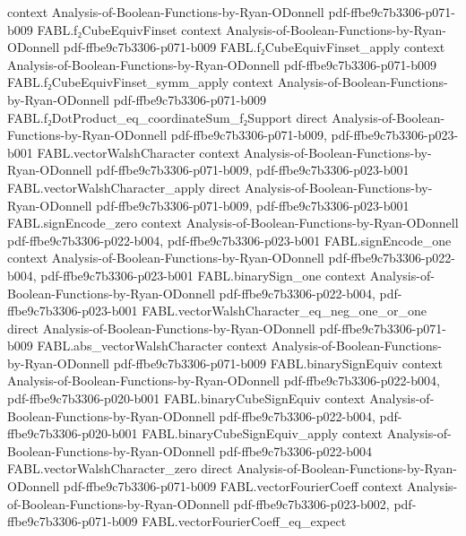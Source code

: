 \begin{theorem}
  {context}
  {Analysis-of-Boolean-Functions-by-Ryan-ODonnell}
  {pdf-ffbe9c7b3306-p071-b009}
\proofstep
  {FABL.f₂CubeEquivFinset}
  {context}
  {Analysis-of-Boolean-Functions-by-Ryan-ODonnell}
  {pdf-ffbe9c7b3306-p071-b009}
\proofstep
  {FABL.f₂CubeEquivFinset_apply}
  {context}
  {Analysis-of-Boolean-Functions-by-Ryan-ODonnell}
  {pdf-ffbe9c7b3306-p071-b009}
\proofstep
  {FABL.f₂CubeEquivFinset_symm_apply}
  {context}
  {Analysis-of-Boolean-Functions-by-Ryan-ODonnell}
  {pdf-ffbe9c7b3306-p071-b009}
\proofstep
  {FABL.f₂DotProduct_eq_coordinateSum_f₂Support}
  {direct}
  {Analysis-of-Boolean-Functions-by-Ryan-ODonnell}
  {pdf-ffbe9c7b3306-p071-b009,
    pdf-ffbe9c7b3306-p023-b001}
\proofstep
  {FABL.vectorWalshCharacter}
  {context}
  {Analysis-of-Boolean-Functions-by-Ryan-ODonnell}
  {pdf-ffbe9c7b3306-p071-b009,
    pdf-ffbe9c7b3306-p023-b001}
\proofstep
  {FABL.vectorWalshCharacter_apply}
  {direct}
  {Analysis-of-Boolean-Functions-by-Ryan-ODonnell}
  {pdf-ffbe9c7b3306-p071-b009,
    pdf-ffbe9c7b3306-p023-b001}
\proofstep
  {FABL.signEncode_zero}
  {context}
  {Analysis-of-Boolean-Functions-by-Ryan-ODonnell}
  {pdf-ffbe9c7b3306-p022-b004,
    pdf-ffbe9c7b3306-p023-b001}
\proofstep
  {FABL.signEncode_one}
  {context}
  {Analysis-of-Boolean-Functions-by-Ryan-ODonnell}
  {pdf-ffbe9c7b3306-p022-b004,
    pdf-ffbe9c7b3306-p023-b001}
\proofstep
  {FABL.binarySign_one}
  {context}
  {Analysis-of-Boolean-Functions-by-Ryan-ODonnell}
  {pdf-ffbe9c7b3306-p022-b004,
    pdf-ffbe9c7b3306-p023-b001}
\proofstep
  {FABL.vectorWalshCharacter_eq_neg_one_or_one}
  {direct}
  {Analysis-of-Boolean-Functions-by-Ryan-ODonnell}
  {pdf-ffbe9c7b3306-p071-b009}
\proofstep
  {FABL.abs_vectorWalshCharacter}
  {context}
  {Analysis-of-Boolean-Functions-by-Ryan-ODonnell}
  {pdf-ffbe9c7b3306-p071-b009}
\proofstep
  {FABL.binarySignEquiv}
  {context}
  {Analysis-of-Boolean-Functions-by-Ryan-ODonnell}
  {pdf-ffbe9c7b3306-p022-b004,
    pdf-ffbe9c7b3306-p020-b001}
\proofstep
  {FABL.binaryCubeSignEquiv}
  {context}
  {Analysis-of-Boolean-Functions-by-Ryan-ODonnell}
  {pdf-ffbe9c7b3306-p022-b004,
    pdf-ffbe9c7b3306-p020-b001}
\proofstep
  {FABL.binaryCubeSignEquiv_apply}
  {context}
  {Analysis-of-Boolean-Functions-by-Ryan-ODonnell}
  {pdf-ffbe9c7b3306-p022-b004}
\proofstep
  {FABL.vectorWalshCharacter_zero}
  {direct}
  {Analysis-of-Boolean-Functions-by-Ryan-ODonnell}
  {pdf-ffbe9c7b3306-p071-b009}
\proofstep
  {FABL.vectorFourierCoeff}
  {context}
  {Analysis-of-Boolean-Functions-by-Ryan-ODonnell}
  {pdf-ffbe9c7b3306-p023-b002,
    pdf-ffbe9c7b3306-p071-b009}
\proofstep
  {FABL.vectorFourierCoeff_eq_expect}

\end{theorem}
